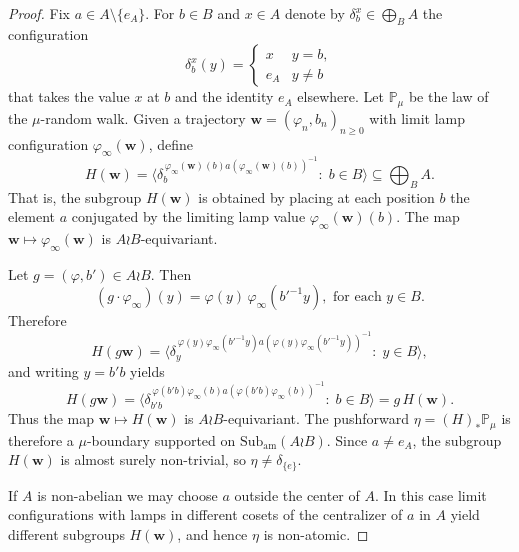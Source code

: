 \documentclass[10pt,a4paper]{amsart}
\begin{document}
	\begin{proof}
		Fix $a\in A\setminus\{e_A\}$. For $b\in B$ and $x\in A$ denote by
		$\delta_b^x\in\bigoplus_B A$ the configuration
		\[
		\delta_b^x(y)=
		\begin{cases}
			x & y=b,\\
			e_A & y\neq b 
		\end{cases}
		\]
		that takes the value $x$ at $b$ and the identity $e_A$ elsewhere. Let $\mathbb P_\mu$ be the law of the $\mu$-random walk.
		Given a trajectory
		$\mathbf w=(\varphi_n,b_n)_{n\ge0}$ with limit lamp configuration
		$\varphi_\infty(\mathbf w)$, define
		\[
		H(\mathbf w)
		=
		\Big\langle
		\delta_b^{\,\varphi_\infty(\mathbf w)(b)a(\varphi_\infty(\mathbf w)(b))^{-1}}
		:\; b\in B
		\Big\rangle
		\subseteq \bigoplus_B A .
		\]
		That is, the subgroup $H(\mathbf{w})$ is obtained by placing at each position $b$
		the element $a$ conjugated by the limiting lamp value $\varphi_{\infty}(\mathbf{w})(b)$. The map $\mathbf w\mapsto\varphi_\infty(\mathbf w)$ is
		$A\wr B$-equivariant. 
		
		Let $g=(\varphi,b')\in A\wr B$. Then
		\[
		(g\cdot \varphi_\infty)(y)
		=
		\varphi(y)\,\varphi_\infty(b'^{-1}y), \text{ for each }y\in B.
		\]
		Therefore
		\[
		H(g\mathbf w)
		=
		\Big\langle
		\delta_y^{\,\varphi(y)\varphi_\infty(b'^{-1}y)a(\varphi(y)\varphi_\infty(b'^{-1}y))^{-1}}
		:\; y\in B
		\Big\rangle,
		\]
		and writing $y=b'b$ yields
		\[
		H(g\mathbf w)
		=
		\Big\langle
		\delta_{b'b}^{\,\varphi(b'b)\varphi_\infty(b)a(\varphi(b'b)\varphi_\infty(b))^{-1}}
		:\; b\in B
		\Big\rangle
		=
		g\,H(\mathbf w).
		\]
		Thus the map $\mathbf w\mapsto H(\mathbf w)$ is $A\wr B$-equivariant.
		The pushforward \( \eta = (H)_*\mathbb P_\mu\) is therefore a $\mu$-boundary supported on
		$\mathrm{Sub}_{\mathrm{am}}(A\wr B)$. Since $a\neq e_A$, the subgroup
		$H(\mathbf w)$ is almost surely non-trivial, so
		$\eta\neq \delta_{\{e\}}$.
		
		If $A$ is non-abelian we may choose $a$ outside the center of $A$. In this case limit configurations with lamps in different cosets of the centralizer of $a$ in $A$ yield different subgroups $H(\mathbf w)$, and hence $\eta$ is non-atomic.
	\end{proof}
\end{document}
